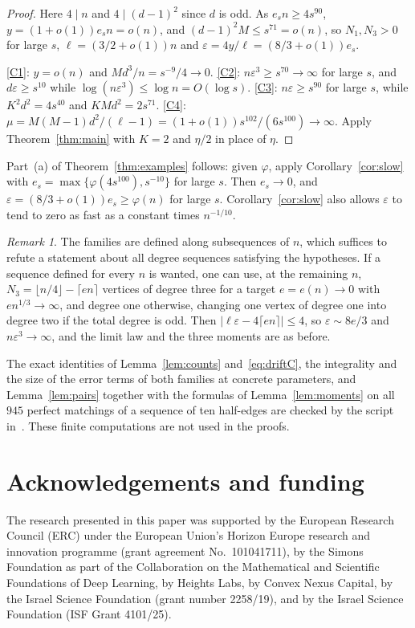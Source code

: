 \documentclass[11pt]{amsart}
\theoremstyle{definition}
\theoremstyle{remark}
\newtheorem{remark}[theorem]{Remark}
\numberwithin{equation}{section}
\newcommand{\eps}{\varepsilon}
\begin{document}
\begin{proof}
Here $4\mid n$ and $4\mid(d-1)^2$ since $d$ is odd. As $e_sn\ge4s^{90}$, $y=(1+o(1))e_sn=o(n)$, and $(d-1)^2M\le s^{71}=o(n)$, so $N_1,N_3>0$ for large $s$, $\ell=(3/2+o(1))n$ and $\eps=4y/\ell=(8/3+o(1))e_s$.

\ref{C1}: $y=o(n)$ and $Md^3/n=s^{-9}/4\to0$. \ref{C2}: $n\eps^3\ge s^{70}\to\infty$ for large $s$, and $d\eps\ge s^{10}$ while $\log(n\eps^3)\le\log n=O(\log s)$. \ref{C3}: $n\eps\ge s^{90}$ for large $s$, while $K^2d^2=4s^{40}$ and $KMd^2=2s^{71}$. \ref{C4}: $\mu=M(M-1)d^2/(\ell-1)=(1+o(1))s^{102}/(6s^{100})\to\infty$. Apply Theorem~\ref{thm:main} with $K=2$ and $\eta/2$ in place of $\eta$.
\end{proof}

Part~(a) of Theorem~\ref{thm:examples} follows: given $\varphi$, apply Corollary~\ref{cor:slow} with $e_s=\max\{\varphi(4s^{100}),s^{-10}\}$ for large $s$. Then $e_s\to0$, and $\eps=(8/3+o(1))e_s\ge\varphi(n)$ for large $s$. Corollary~\ref{cor:slow} also allows $\eps$ to tend to zero as fast as a constant times $n^{-1/10}$.

\begin{remark}\label{rem:alln}
The families are defined along subsequences of $n$, which suffices to refute a statement about all degree sequences satisfying the hypotheses. If a sequence defined for every $n$ is wanted, one can use, at the remaining $n$, $N_3=\lfloor n/4\rfloor-\lceil e n\rceil$ vertices of degree three for a target $e=e(n)\to0$ with $en^{1/3}\to\infty$, and degree one otherwise, changing one vertex of degree one into degree two if the total degree is odd. Then $|\ell\eps-4\lceil en\rceil|\le4$, so $\eps\sim 8e/3$ and $n\eps^3\to\infty$, and the limit law and the three moments are as before.
\end{remark}

The exact identities of Lemma~\ref{lem:counts} and~\eqref{eq:driftC}, the integrality and the size of the error terms of both families at concrete parameters, and Lemma~\ref{lem:pairs} together with the formulas of Lemma~\ref{lem:moments} on all $945$ perfect matchings of a sequence of ten half-edges are checked by the script in~\cite{code}. These finite computations are not used in the proofs.

\section*{Acknowledgements and funding}
The research presented in this paper was supported by the European Research
Council (ERC) under the European Union's Horizon Europe research and
innovation programme (grant agreement No.~101041711), by the Simons
Foundation as part of the Collaboration on the Mathematical and Scientific
Foundations of Deep Learning, by Heights Labs, by Convex Nexus Capital, by
the Israel Science Foundation (grant number 2258/19), and by the Israel
Science Foundation (ISF Grant 4101/25).
\end{document}
